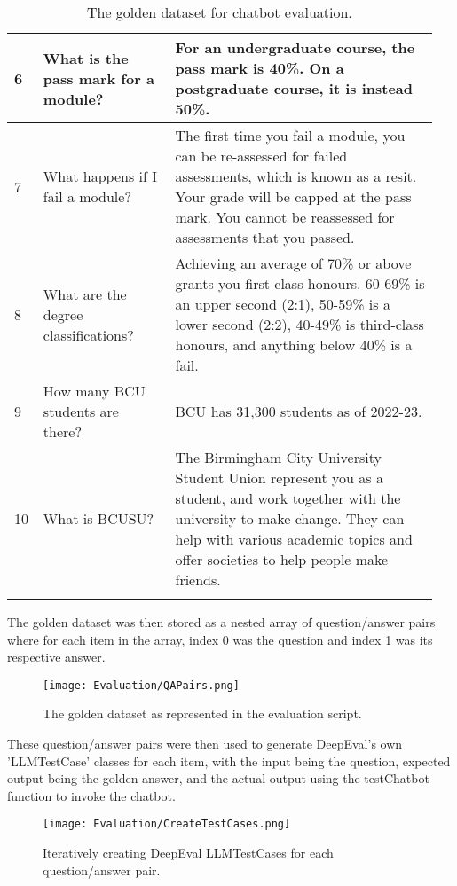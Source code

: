 \begin{longtable}{ | p{0.05\linewidth} | p{0.3\linewidth} | p{0.6\linewidth} | }
    \hline 
    6 & What is the pass mark for a module? &
    For an undergraduate course, the pass mark is 40\%. On a postgraduate course, it is instead 50\%. \\
    \hline 
    7 & What happens if I fail a module? &
    The first time you fail a module, you can be re-assessed for failed assessments, which is known as a resit. Your grade will be capped at the pass mark. You cannot be reassessed for assessments that you passed. \\ 
    \hline 
    8 & What are the degree classifications? &
    Achieving an average of 70\% or above grants you first-class honours. 60-69\% is an upper second (2:1), 50-59\% is a lower second (2:2), 40-49\% is third-class honours, and anything below 40\% is a fail. \\
    \hline 
    9 & How many BCU students are there? &
    BCU has 31,300 students as of 2022-23. \\ 
    \hline 
    10 & What is BCUSU? &
    The Birmingham City University Student Union represent you as a student, and work together with the university to make change. They can help with various academic topics and offer societies to help people make friends. \\
    \hline
    \caption{The golden dataset for chatbot evaluation.}\label{tab:GoldenDataset}
\end{longtable}

\para The golden dataset was then stored as a nested array of question/answer pairs where for each item in the array, index 0 was the question 
and index 1 was its respective answer. 

\begin{figure}[H]
    \centering
    \texttt{[image: Evaluation/QAPairs.png]}
    \caption{The golden dataset as represented in the evaluation script. \label{fig:GoldenDataset}}
\end{figure}

These question/answer pairs were then used to generate DeepEval's own 'LLMTestCase' classes for each item, 
with the input being the question, expected output being the golden answer, and the actual output using the 
testChatbot function to invoke the chatbot.

\begin{figure}[H]
    \centering
    \texttt{[image: Evaluation/CreateTestCases.png]}
    \caption{Iteratively creating DeepEval LLMTestCases for each question/answer pair. \label{fig:CreateTestCases}}
\end{figure}

